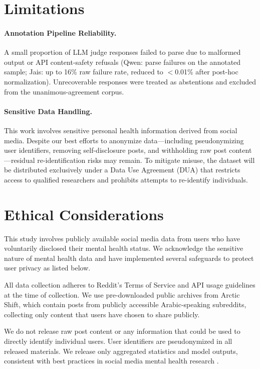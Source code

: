 \documentclass[11pt]{article}
\begin{document}
\section*{Limitations}
\paragraph{Annotation Pipeline Reliability.}
A small proportion of LLM judge responses failed to parse due to malformed output or API content-safety refusals (Qwen: parse failures on the annotated sample; Jais: up to 16\% raw failure rate, reduced to $<$0.01\% after post-hoc normalization). Unrecoverable responses were treated as abstentions and excluded from the unanimous-agreement corpus.

\paragraph{Sensitive Data Handling.}
This work involves sensitive personal health information derived from social media. Despite our best efforts to anonymize data---including pseudonymizing user identifiers, removing self-disclosure posts, and withholding raw post content---residual re-identification risks may remain. To mitigate misuse, the dataset will be distributed exclusively under a Data Use Agreement (DUA) that restricts access to qualified researchers and prohibits attempts to re-identify individuals.


\section*{Ethical Considerations}
\label{sec:ethics}
This study involves publicly available social media data from users who have voluntarily disclosed their mental health status. We acknowledge the sensitive nature of mental health data and have implemented several safeguards to protect user privacy as listed below.

All data collection adheres to Reddit's Terms of Service and API usage guidelines at the time of collection. We use pre-downloaded public archives from Arctic Shift, which contain posts from publicly accessible Arabic-speaking subreddits, collecting only content that users have chosen to share publicly.

We do not release raw post content or any information that could be used to directly identify individual users. User identifiers are pseudonymized in all released materials. We release only aggregated statistics and model outputs, consistent with best practices in social media mental health research \cite{harrigian2021state}.
\end{document}

